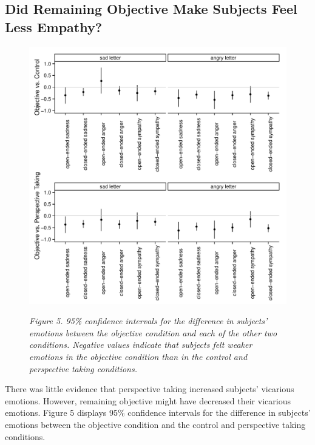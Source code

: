 \documentclass[man,a4paper,noextraspace,apacite]{apa6}\usepackage[]{graphicx}\usepackage[]{color}
\makeatletter
\def\maxwidth{ %
  \ifdim\Gin@nat@width>\linewidth
    \linewidth
  \else
    \Gin@nat@width
  \fi
}
\newenvironment{knitrout}{}{} %
\makeatother
\begin{document}
\subsection{Did Remaining Objective Make Subjects Feel Less Empathy?}

\begin{figure}
\begin{knitrout}
\color{fgcolor}
\includegraphics[width=\maxwidth]{figure/Figure5CIPlotsObjectiveVSOthers-1} 

\end{knitrout}
\textit{Figure 5. 95\% confidence intervals for the difference in subjects' emotions between the objective condition and each of the other two conditions. Negative values indicate that subjects felt weaker emotions in the objective condition than in the control and perspective taking conditions.}
\
\end{figure}

There was little evidence that perspective taking increased subjects' vicarious emotions. However, remaining objective might have decreased their vicarious emotions. Figure 5 displays 95\% confidence intervals for the difference in subjects' emotions between the objective condition and the control and perspective taking conditions. 
\end{document}

